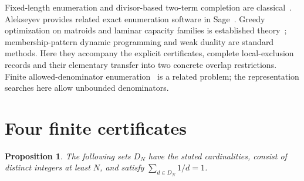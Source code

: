 \documentclass[10pt,a4paper]{article}
\newtheorem{proposition}{Proposition}
\begin{document}
Fixed-length enumeration and divisor-based two-term completion are
classical~\cite{eppstein}. Alekseyev provides related exact enumeration software
in Sage~\cite{aleks}. Greedy optimization on matroids and laminar capacity
families is established theory~\cite{edmonds,fife}; membership-pattern dynamic
programming and weak duality are standard methods. Here they accompany the
explicit certificates, complete local-exclusion records and their elementary
transfer into two concrete overlap restrictions. Finite allowed-denominator
enumeration~\cite{martin} is a related problem; the representation searches here
allow unbounded denominators.

\section{Four finite certificates}
\begin{proposition}\label{prop:certificates}
The following sets $D_N$ have the stated cardinalities, consist of distinct
integers at least $N$, and satisfy $\sum_{d\in D_N}1/d=1$.
\end{proposition}
\end{document}
